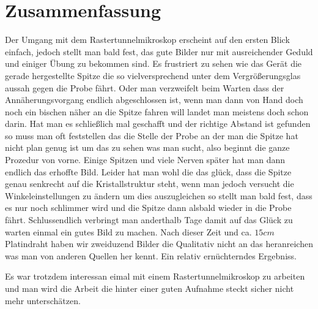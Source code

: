 \documentclass[12pt]{article}
\begin{document}
\section{Zusammenfassung}
Der Umgang mit dem Rastertunnelmikroskop erscheint auf den ersten Blick einfach, jedoch stellt man bald fest, das gute Bilder nur mit ausreichender Geduld und einiger Übung zu bekommen sind. Es frustriert zu sehen wie das Gerät die gerade hergestellte Spitze die so vielversprechend unter dem Vergrößerungsglas aussah gegen die Probe fährt. Oder man verzweifelt beim Warten dass der Annäherungsvorgang endlich abgeschlossen ist, wenn man dann von Hand doch noch ein bischen näher an die Spitze fahren will landet man meistens doch schon darin. Hat man es schließlich mal geschafft und der richtige Abstand ist gefunden so muss man oft feststellen das die Stelle der Probe an der man die Spitze hat nicht plan genug ist um das zu sehen was man sucht, also beginnt die ganze Prozedur von vorne. Einige Spitzen und viele Nerven später hat man dann endlich das erhoffte Bild. Leider hat man wohl die das glück, dass die Spitze genau senkrecht auf die Kristallstruktur steht, wenn man jedoch versucht die Winkeleinstellungen zu ändern um dies auszugleichen so stellt man bald fest, dass es nur noch schlimmer wird und die Spitze dann alsbald wieder in die Probe fährt. Schlussendlich verbringt man anderthalb Tage damit auf das Glück zu warten einmal ein gutes Bild zu machen. Nach dieser Zeit und ca. $15cm$ Platindraht haben wir zweiduzend Bilder die Qualitativ nicht an das heranreichen was man von anderen Quellen her kennt. Ein relativ ernüchterndes Ergebniss.

Es war trotzdem interessan eimal mit einem Rastertunnelmikroskop zu arbeiten und man wird die Arbeit die hinter einer guten Aufnahme steckt sicher nicht mehr unterschätzen.
\end{document}
